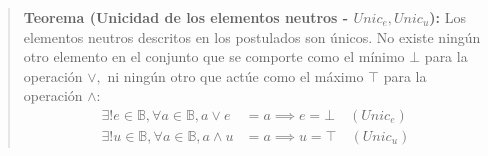 \begin{quote}\textbf{Teorema (Unicidad de los elementos neutros - $Unic_e, Unic_u$):}\label{unicidad_neutros}
Los elementos neutros descritos en los postulados son únicos. No existe ningún otro elemento en el conjunto que se comporte como el mínimo $\bot$ para la operación $\vee,$ ni ningún otro que actúe como el máximo $\top$ para la operación $\wedge:$
\begin{align*}
    \exists! e \in \mathbb{B}, \forall a \in \mathbb{B}, a \vee e &= a \implies e = \bot \quad (Unic_e) \\
    \exists! u \in \mathbb{B}, \forall a \in \mathbb{B}, a \wedge u &= a \implies u = \top \quad (Unic_u)
\end{align*}
\end{quote}


